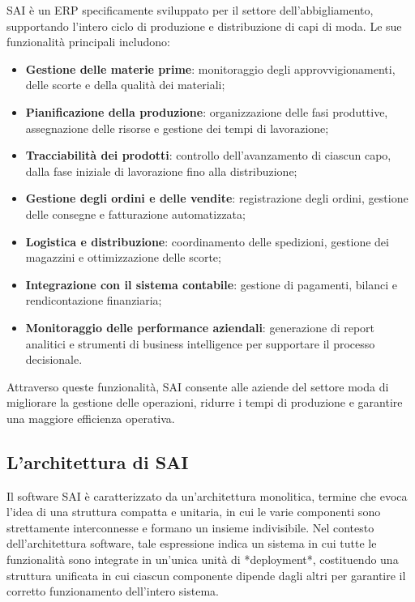         \vspace{0.2 em}
        \noindent SAI è un ERP specificamente sviluppato per il settore dell'abbigliamento, supportando l’intero ciclo di produzione e distribuzione di capi di moda. Le sue funzionalità principali includono:  
        \begin{itemize}
            \item \textbf{Gestione delle materie prime}: monitoraggio degli approvvigionamenti, delle scorte e della qualità dei materiali;
            \item \textbf{Pianificazione della produzione}: organizzazione delle fasi produttive, assegnazione delle risorse e gestione dei tempi di lavorazione;
            \item \textbf{Tracciabilità dei prodotti}: controllo dell’avanzamento di ciascun capo, dalla fase iniziale di lavorazione fino alla distribuzione;
            \item \textbf{Gestione degli ordini e delle vendite}: registrazione degli ordini, gestione delle consegne e fatturazione automatizzata;
            \item \textbf{Logistica e distribuzione}: coordinamento delle spedizioni, gestione dei magazzini e ottimizzazione delle scorte;
            \item \textbf{Integrazione con il sistema contabile}: gestione di pagamenti, bilanci e rendicontazione finanziaria;
            \item \textbf{Monitoraggio delle performance aziendali}: generazione di report analitici e strumenti di business intelligence per supportare il processo decisionale.  
        \end{itemize}

        \vspace{0.2 em}
        \noindent Attraverso queste funzionalità, SAI consente alle aziende del settore moda di migliorare la gestione delle operazioni, ridurre i tempi di produzione e garantire una maggiore efficienza operativa.
        
        \subsection{L'architettura di SAI}
        Il software SAI è caratterizzato da un’architettura monolitica, termine che evoca l’idea di una struttura compatta e unitaria, in cui le varie componenti sono strettamente interconnesse e formano un insieme indivisibile. Nel contesto dell'architettura software, tale espressione indica un sistema in cui tutte le funzionalità sono integrate in un’unica unità di *deployment*, costituendo una struttura unificata in cui ciascun componente dipende dagli altri per garantire il corretto funzionamento dell’intero sistema.  

